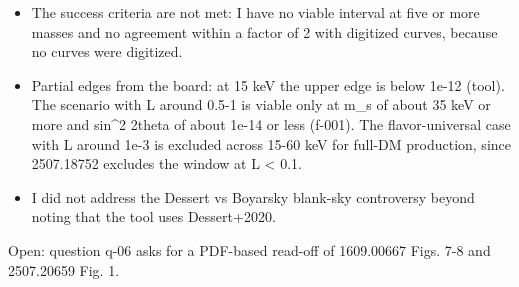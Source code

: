 \documentclass[11pt,a4paper]{article}
\begin{document}
\begin{itemize}
  \item The success criteria are not met: I have no viable interval at five or more masses and no agreement within a factor of 2 with digitized curves, because no curves were digitized.
  \item Partial edges from the board: at 15 keV the upper edge is below 1e-12 (tool). The scenario with L around 0.5-1 is viable only at m\_s of about 35 keV or more and sin\textasciicircum{}2 2theta of about 1e-14 or less (f-001). The flavor-universal case with L around 1e-3 is excluded across 15-60 keV for full-DM production, since 2507.18752 excludes the window at L \textless{} 0.1.
  \item I did not address the Dessert vs Boyarsky blank-sky controversy beyond noting that the tool uses Dessert+2020.
\end{itemize}
Open: question q-06 asks for a PDF-based read-off of 1609.00667 Figs. 7-8 and 2507.20659 Fig. 1.
\end{document}
